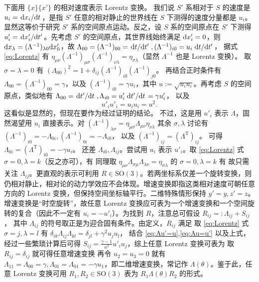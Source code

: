 下面用 $\{x\}\{x'\}$ 的相对速度表示 Lorentz 变换。
我们说 $S'$ 系相对于 $S$ 的速度是 $u_i=\dv*{x_i}{t}$，是指 $S'$ 任意的相对静止的世界线在 $S$ 下测得的速度分量都是 $u_i$。显然这等价于研究 $S'$ 系的空间原点运动。反之，设 $S$ 系的空间原点在 $S'$ 下测得 $u'_i=\dv*{x'_i}{t'}$。先考虑 $S'$ 的空间原点，其世界线始终满足 $\dd x'_i=0$，则 $\dd x_\lambda=(\Lambda^{-1})_{\lambda 0}\dd x'_0$，故 $\Lambda_{00}=(\Lambda^{-1})_{00}=\dv*{t}{t'},(\Lambda^{-1})_{i0}=u_i\dv*{t}{t'}$，
据式 \eqref{eq:Lorentz} 有 $\eta_{\mu\nu}(\Lambda^{-1})_{\mu\sigma}(\Lambda^{-1})_{\nu\lambda}={\eta}_{\sigma\lambda}$（显然 $\Lambda^{-1}$ 也是 Lorentz 变换）。
取 $\sigma=\lambda=0$ 有 $(\Lambda_{00})^2=1+\delta_{ij}(\Lambda^{-1})_{i0}(\Lambda^{-1})_{j0}$。
    再结合正时条件有 $\Lambda_{00}=(\Lambda^{-1})_{00}=\gamma$，以及 $(\Lambda^{-1})_{i0}=\gamma u_i$，其中 $u:=\sqrt{u_i u_i}$。再考虑 $S$ 的空间原点，类似地有 $\Lambda_{00}=\dv*{t'}{t},\Lambda_{i0}=u'_i \dv*{t'}{t}=\gamma u'_i$，
以及
\[u'_iu'_i=u_i u_i=u^2.\]
这看似是显然的，但现在要作为经过证明的结论。
不过，这是用 $u'_i$ 表示 $\Lambda$，固然渴望用 $u_i$ 直接表示。对 $(\Lambda^{-1})_{\lambda\sigma}=\eta_{\mu\sigma}\Lambda_{\mu\nu}\eta_{\nu\lambda}$ 其余 $\sigma,\lambda$ 讨论有 $(\Lambda^{-1})_{i0}=-\Lambda_{0i},(\Lambda^{-1})_{0i} =-\Lambda_{i0}$，
以及 $(\Lambda^{-1})_{ij}=(\Lambda^\mathrm{T})_{ij}$。
可得 $\Lambda_{0i}=(\Lambda^\mathrm{T})_{i0}=-\gamma u_i$。
还差 $\Lambda_{i0},\Lambda_{ij}$。尝试用 $u_i$ 表示 $u'_i$。取 \eqref{eq:Lorentz} 式 $\sigma=0,\lambda=k$（反之亦可），有
同理取 $\eta_{\mu\nu}\Lambda_{\sigma\mu}\Lambda_{\lambda\nu}={\eta}_{\sigma\lambda}$ 的 $\sigma=0,\lambda=k$ 有
故只需关注 $\Lambda_{ij}$。更直观的表示可利用 $R\in\mathrm{SO}(3)$。若两坐标系仅差一个旋转变换，则仍相对静止，相对论的动力学效应不会体现。增速变换即指这类相对速度可朝任意方向的 Lorentz 变换，但保持空间坐标轴平行。二维特殊情形保持 $y'=y,z'=z$。增速变换是“时空旋转”，故任意 Lorentz 变换应可表为一个增速变换和一个空间旋转的复合（因此不一定有 $u_i=-u'_i$）。为找到 $R$，注意总可假设
$R_{ij}=:\Lambda_{ij}+S_{ij}$，
其中 $\Lambda_{ij}$ 的符号取正是为迎合固有条件。由定义，$R_{ij}$ 满足
取 \eqref{eq:Lorentz} 式 $\sigma=j,\lambda=l$ 有 $\delta_{ik}\Lambda_{ij}\Lambda_{kl}=\delta_{jl}+ \gamma^2 u_j u_l$，
结合 \eqref{eq:Au'=u},\eqref{eq:Au=u'} 以及上式，经过一些繁琐计算后可得 $S_{ij}=\frac{\gamma-1}{u^2}u'_i u_j$，综上任意 Lorentz 变换可表为
取 $R_{ij}=\delta_{ij}$ 就可得任意增速变换
再令 $u_2=u_3=0$ 就有 $\Lambda_{11}=\Lambda_{00}=\gamma, \Lambda_{01}=\Lambda_{01}=-\gamma u_1$，即二维增速变换，常记作 $\Lambda(\theta)$。鉴于此，任意 Lorentz 变换可用 $R_{1},R_{2}\in\mathrm{SO}(3)$ 表为 $R_{1} \Lambda(\theta) R_{2}$ 的形式。
